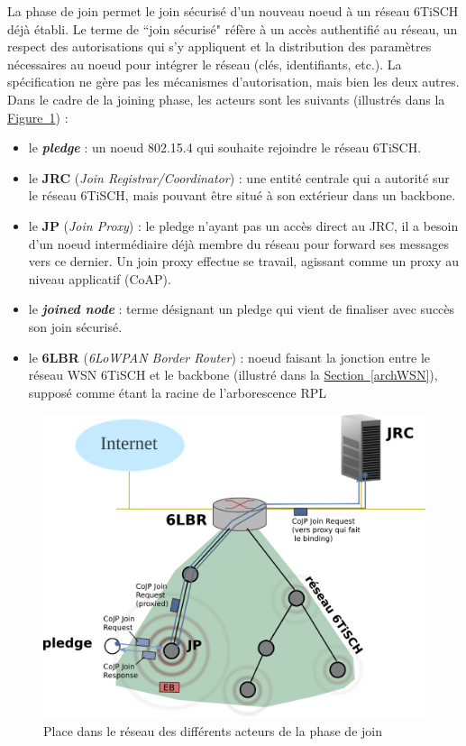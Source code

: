 \documentclass[]{report}
\newcommand{\wordlink}[2]{\hyperref[#2]{#1~\ref{#2}}}
\begin{document}
La phase de join permet le join sécurisé d'un nouveau noeud à un réseau 6TiSCH déjà établi. Le terme de ``join sécurisé" réfère à un accès authentifié au réseau, un respect des autorisations qui s'y appliquent et la distribution des paramètres nécessaires au noeud pour intégrer le réseau (clés, identifiants, etc.). La spécification \cite{ietf-6tisch-minimal-security-15} ne gère pas les mécanismes d'autorisation, mais bien les deux autres. Dans le cadre de la joining phase, les acteurs sont les suivants (illustrés dans la \wordlink{Figure}{fig:joining_phase_network}) :
\vspace{0.1cm}
\begin{itemize}[label=$\bullet$]
\item le \textit{\textbf{pledge}} : un noeud 802.15.4 qui souhaite rejoindre le réseau 6TiSCH.
\item le \textbf{JRC} (\textit{Join Registrar/Coordinator}) : une entité centrale qui a autorité sur le réseau 6TiSCH, mais pouvant être situé à son extérieur dans un backbone.
\item le \textbf{JP} (\textit{Join Proxy}) : le pledge n'ayant pas un accès direct au JRC, il a besoin d'un noeud intermédiaire déjà membre du réseau pour forward ses messages vers ce dernier. Un join proxy effectue se travail, agissant comme un proxy au niveau applicatif (CoAP). 
\item le \textit{\textbf{joined node}} : terme désignant un pledge qui vient de finaliser avec succès son join sécurisé.
\item le \textbf{6LBR} (\textit{6LoWPAN Border Router}) : noeud faisant la jonction entre le réseau WSN 6TiSCH et le backbone (illustré dans la \wordlink{Section}{archWSN}), supposé comme étant la racine de l'arborescence RPL 
\end{itemize}

	\begin{figure}[!h]
	\centering
	\includegraphics[width=0.73\linewidth]{Joining_phase_network}
	\caption{Place dans le réseau des différents acteurs de la phase de join}
	\label{fig:joining_phase_network}
	\end{figure}
\end{document}
